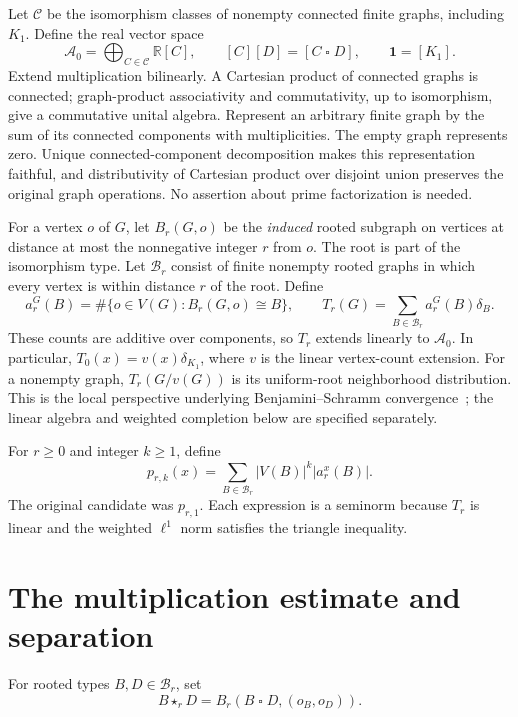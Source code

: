 \documentclass[11pt]{article}
\theoremstyle{definition}\newtheorem{definition}[theorem]{Definition}
\newcommand{\R}{\mathbb R}
\newcommand{\A}{\mathcal A}
\newcommand{\B}{\mathcal B}
\newcommand{\one}{\mathbf 1}
\newcommand{\sq}{\mathbin{\square}}
\newcommand{\abs}[1]{\left|#1\right|}
\begin{document}
Let $\mathcal C$ be the isomorphism classes of nonempty connected finite graphs, including $K_1$. Define the real vector space
\[
 \A_0=\bigoplus_{C\in\mathcal C}\R[C],\qquad
 [C][D]=[C\sq D],\qquad \one=[K_1].
\]
Extend multiplication bilinearly. A Cartesian product of connected graphs is connected; graph-product associativity and commutativity, up to isomorphism, give a commutative unital algebra. Represent an arbitrary finite graph by the sum of its connected components with multiplicities. The empty graph represents zero. Unique connected-component decomposition makes this representation faithful, and distributivity of Cartesian product over disjoint union preserves the original graph operations. No assertion about prime factorization is needed.

For a vertex $o$ of $G$, let $B_r(G,o)$ be the \emph{induced} rooted subgraph on vertices at distance at most the nonnegative integer $r$ from $o$. The root is part of the isomorphism type. Let $\B_r$ consist of finite nonempty rooted graphs in which every vertex is within distance $r$ of the root. Define
\[
 a_r^G(B)=\#\{o\in V(G): B_r(G,o)\cong B\},\qquad
 T_r(G)=\sum_{B\in\B_r}a_r^G(B)\delta_B.
\]
These counts are additive over components, so $T_r$ extends linearly to $\A_0$. In particular, $T_0(x)=v(x)\delta_{K_1}$, where $v$ is the linear vertex-count extension. For a nonempty graph, $T_r(G/v(G))$ is its uniform-root neighborhood distribution. This is the local perspective underlying Benjamini--Schramm convergence~\cite{BS}; the linear algebra and weighted completion below are specified separately.

For $r\ge0$ and integer $k\ge1$, define
\begin{equation}\label{eq:p}
 p_{r,k}(x)=\sum_{B\in\B_r}\abs{V(B)}^k\abs{a_r^x(B)}.
\end{equation}
The original candidate was $p_{r,1}$. Each expression is a seminorm because $T_r$ is linear and the weighted $\ell^1$ norm satisfies the triangle inequality.

\section{The multiplication estimate and separation}

For rooted types $B,D\in\B_r$, set
\[
 B\star_r D=B_r(B\sq D,(o_B,o_D)).
\]
\end{document}

